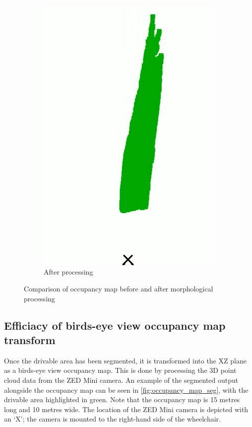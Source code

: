 \begin{figure}[p]
\begin{subfigure}{.4\textwidth}
        \includegraphics[width=0.98\linewidth,frame]{images/occupancy_map1.png}
        \caption{After processing}
    \end{subfigure}
    \caption{Comparison of occupancy map before and after morphological processing}
    \label{fig:morphological_processing}
\end{figure}

\subsection{Efficiacy of birds-eye view occupancy map transform}
Once the drivable area has been segmented, it is transformed into the XZ plane
as a birds-eye view occupancy map. This is done by processing the 3D point cloud
data from the ZED Mini camera.
An example of the segmented output alongside the occupancy map can be seen in \cref{fig:occupancy_map_seg},
with the drivable area highlighted in green.
Note that the occupancy map is 15 metres long and 10 metres wide. The location of the ZED Mini camera is depicted
with an `X'; the camera is mounted to the right-hand side of the wheelchair.

